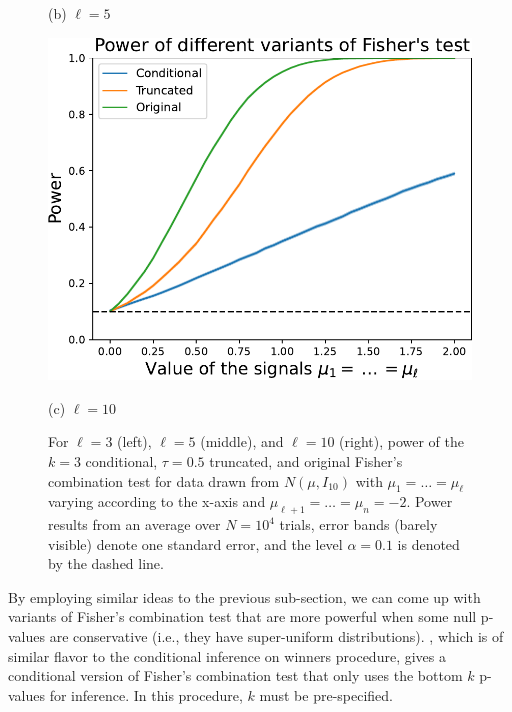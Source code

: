 \documentclass{article}
\begin{document}
\begin{figure}
\begin{minipage}{0.32\textwidth}
        \caption*{(b) $\ell=5$}
    \end{minipage}
    \hfill
    \hspace{0.01\textwidth}
    \begin{minipage}{0.32\textwidth}
        \centering
        \includegraphics[width=\textwidth]{fig/fisher_ell=10.pdf}
        \caption*{(c) $\ell=10$}
    \end{minipage}
    \caption{ For $\ell=3$ (left), $\ell=5$ (middle), and $\ell=10$ (right), power of the $k=3$ conditional, $\tau=0.5$ truncated, and original Fisher's combination test for data drawn from $N(\mu, I_{10})$ with $\mu_{1}= \dots = \mu_{\ell}$ varying according to the x-axis and $\mu_{\ell + 1} = \dots = \mu_n = -2$. Power results from an average over $N=10^4$ trials, error bands (barely visible) denote one standard error, and the level $\alpha=0.1$ is denoted by the dashed line.}
    \label{fig:fisher}
\end{figure}

By employing similar ideas to the previous sub-section, we can come up with variants of Fisher's combination test that are more powerful when some null p-values are conservative (i.e., they have super-uniform distributions). , which is of similar flavor to the conditional inference on winners procedure, gives a conditional version of Fisher's combination test that only uses the bottom $k$ p-values for inference. In this procedure, $k$ must be pre-specified. 
\end{document}
